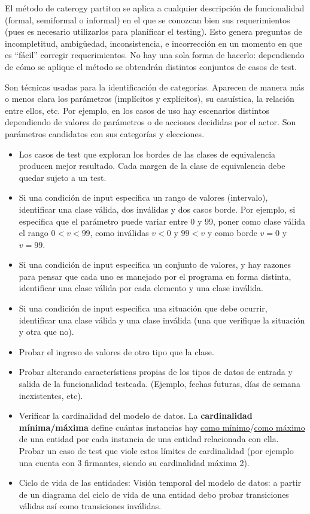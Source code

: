 \documentclass[]{article}
\begin{document}
El método de caterogy partiton se aplica a cualquier descripción de funcionalidad (formal, semiformal o informal) en el que se conozcan bien sus requerimientos (pues es necesario utilizarlos para planificar el testing). Esto genera preguntas de incompletitud, ambigüedad, inconsistencia, e incorrección en un momento en que es ``fácil'' corregir requerimientos. No hay una sola forma de hacerlo: dependiendo de cómo se aplique el método se obtendrán distintos conjuntos de casos de test.

Son técnicas usadas para la identificación de categorías. Aparecen de manera más o menos clara los parámetros (implícitos y explícitos), su casuística, la relación entre ellos, etc. Por ejemplo, en los casos de uso hay escenarios distintos dependiendo de valores de parámetros o de acciones decididas por el actor. Son parámetros candidatos con sus categorías y elecciones.

\begin{itemize}
	\item Los casos de test que exploran los bordes de las clases de equivalencia producen mejor resultado. Cada margen de la clase de equivalencia debe quedar sujeto a un test.
	\item Si una condición de input especifica un rango de valores (intervalo), identificar una clase válida, dos inválidas y dos casos borde. Por ejemplo, si especifica que el parámetro puede variar entre 0 y 99, poner como clase válida el rango $0 < v < 99$, como inválidas $v < 0$ y  $99 < v$ y como borde $v=0$ y $v=99$.
	\item Si una condición de input especifica un conjunto de valores, y hay razones para pensar que cada uno es manejado por el programa en forma distinta, identificar una clase válida por cada elemento y una clase inválida.
	\item Si una condición de input especifica una situación que debe ocurrir, identificar una clase válida y una clase inválida (una que verifique la situación y otra que no).
	\item Probar el ingreso de valores de otro tipo que la clase.
	\item Probar alterando características propias de los tipos de datos de entrada y salida de la funcionalidad testeada. (Ejemplo, fechas futuras, días de semana inexistentes, etc).
	\item Verificar la cardinalidad del modelo de datos. La \textbf{cardinalidad mínima/máxima} define cuántas instancias hay \underline{como mínimo}/\underline{como máximo} de una entidad por cada instancia de una entidad relacionada con ella. Probar un caso de test que viole estos límites de cardinalidad (por ejemplo una cuenta con 3 firmantes, siendo su cardinalidad máxima 2).
	\item Ciclo de vida de las entidades: Visión temporal del modelo de datos: a partir de un diagrama del ciclo de vida de una entidad debo probar transiciones válidas así como transiciones inválidas.
\end{itemize}
\end{document}
